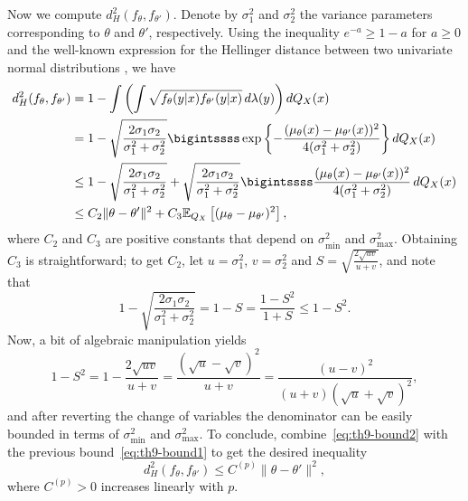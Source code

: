 Now we compute \(d^2_H(f_\theta, f_{\theta'})\). Denote by \(\sigma^2_1\) and \(\sigma^2_2\) the variance parameters corresponding to \(\theta\) and \(\theta'\), respectively. Using the inequality \(e^{-a}\geq 1-a\) for \(a\geq 0\) and the well-known expression for the Hellinger distance between two univariate normal distributions \citep[e.g.][p.~51]{pardo2018statistical}, we have
\begin{align}\label{eq:th9-bound2}
  d^2_H(f_\theta, f_{\theta'}) & = 1 - \int \left(\int\sqrt{f_\theta(y|x) f_{\theta'}(y|x)}\, d\lambda(y)\right) dQ_X(x) \notag                                                                                                                                \\
                               & = 1 - \sqrt{\frac{2\sigma_1\sigma_2}{\sigma_1^2 + \sigma_2^2}}\bigintssss \exp\left\{ -\frac{(\mu_\theta(x) - \mu_{\theta'}(x))^2}{4(\sigma_1^2 + \sigma_2^2)} \right\} dQ_X(x) \notag                                        \\
                               & \leq 1 - \sqrt{\frac{2\sigma_1\sigma_2}{\sigma_1^2+\sigma_2^2}} + \sqrt{\frac{2\sigma_1\sigma_2}{\sigma_1^2 + \sigma_2^2}} \bigintssss \frac{(\mu_\theta(x) - \mu_{\theta'}(x))^2}{4(\sigma_1^2+\sigma_2^2)}\, dQ_X(x) \notag \\
                               & \leq C_2\|\theta - \theta'\|^2 + C_3 \mathbb E_{Q_X}\left[(\mu_\theta - \mu_{\theta'})^2\right],
\end{align}
where \(C_2\) and \(C_3\) are positive constants that depend on \(\sigma^2_{\text{min}}\) and \(\sigma^2_{\text{max}}\). Obtaining \(C_3\) is straightforward; to get \(C_2\), let \(u=\sigma_1^2\), \(v=\sigma_2^2\) and \(S=\sqrt{\frac{2\sqrt{uv}}{u+v}}\), and note that
\[
  1 - \sqrt{\frac{2\sigma_1\sigma_2}{\sigma_1^2 + \sigma_2^2}} = 1-S = \frac{1-S^2}{1+S} \leq 1 - S^2.
\]
Now, a bit of algebraic manipulation yields
\begin{equation}\label{eq:th9-computation-S}
  1 - S^2 = 1 - \frac{2\sqrt{uv}}{u+v} = \frac{(\sqrt{u}-\sqrt{v})^2}{u+v} = \frac{(u-v)^2}{(u+v)(\sqrt{u} + \sqrt{v})^2},
\end{equation}
and after reverting the change of variables the denominator can be easily bounded in terms of \(\sigma^2_{\text{min}}\) and \(\sigma^2_{\text{max}}\). To conclude, combine~\eqref{eq:th9-bound2} with the previous bound~\eqref{eq:th9-bound1} to get the desired inequality
\begin{equation}\label{eq:th9-bound3}
  d^2_H(f_\theta, f_{\theta'}) \leq C^{(p)} \|\theta - \theta'\|^2,
\end{equation}
where \(C^{(p)}>0\) increases linearly with \(p\).

